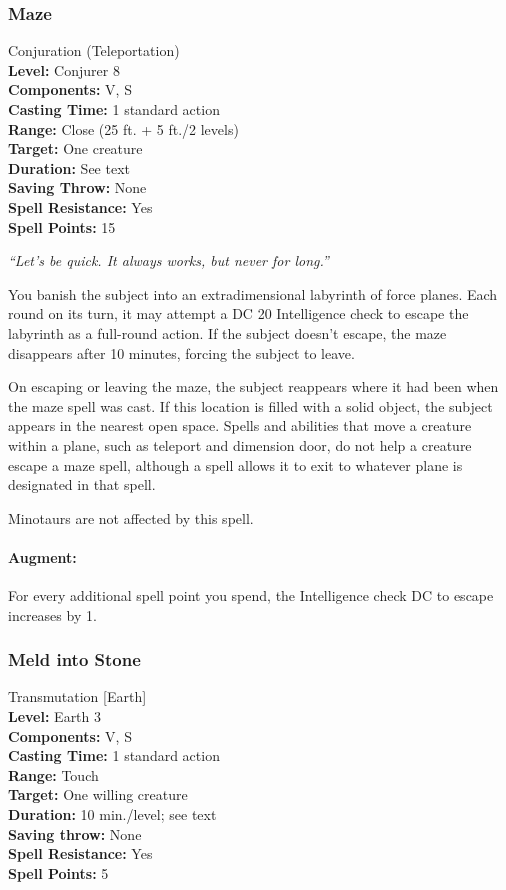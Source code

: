 \subsubsection{Maze}
\label{Spell:Maze}
Conjuration (Teleportation)
\\ \textbf{Level:} Conjurer 8
\\ \textbf{Components:} V, S
\\ \textbf{Casting Time:} 1 standard action
\\ \textbf{Range:} Close (25 ft. + 5 ft./2 levels)
\\ \textbf{Target:} One creature
\\ \textbf{Duration:} See text
\\ \textbf{Saving Throw:} None
\\ \textbf{Spell Resistance:} Yes
\\ \textbf{Spell Points:} 15

\emph{``Let's be quick. It always works, but never for long.''}

You banish the subject into an extradimensional labyrinth of force planes. 
Each round on its turn, it may attempt a DC 20 Intelligence check to escape the labyrinth as a full-round action. 
If the subject doesn't escape, the maze disappears after 10 minutes, forcing the subject to leave.

On escaping or leaving the maze, the subject reappears where it had been when the maze spell was cast. 
If this location is filled with a solid object, the subject appears in the nearest open space. 
Spells and abilities that move a creature within a plane, such as teleport and dimension door, 
do not help a creature escape a maze spell, although a  spell allows it to exit to whatever plane is designated in that spell. 

Minotaurs are not affected by this spell.

\paragraph{Augment:} For every additional spell point you spend, the Intelligence check DC to escape increases by 1.
\subsubsection{Meld into Stone}
\label{Spell:MeldIntoStone}
Transmutation [Earth]
\\ \textbf{Level:} Earth 3
\\ \textbf{Components:} V, S
\\ \textbf{Casting Time:} 1 standard action
\\ \textbf{Range:} Touch
\\ \textbf{Target:} One willing creature
\\ \textbf{Duration:} 10 min./level; see text
\\ \textbf{Saving throw:} None
\\ \textbf{Spell Resistance:} Yes
\\ \textbf{Spell Points:} 5

